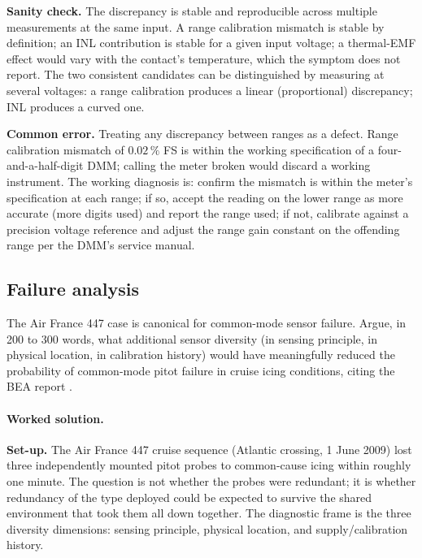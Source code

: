 \textbf{Sanity check.} The discrepancy is stable and reproducible
across multiple measurements at the same input. A range
calibration mismatch is stable by definition; an INL contribution
is stable for a given input voltage; a thermal-EMF effect would
vary with the contact's temperature, which the symptom does not
report. The two consistent candidates can be distinguished by
measuring at several voltages: a range calibration produces a
linear (proportional) discrepancy; INL produces a curved one.

\textbf{Common error.} Treating any discrepancy between ranges
as a defect. Range calibration mismatch of $0.02\,\%$ FS is
within the working specification of a four-and-a-half-digit DMM;
calling the meter broken would discard a working instrument. The
working diagnosis is: confirm the mismatch is within the meter's
specification at each range; if so, accept the reading on the
lower range as more accurate (more digits used) and report the
range used; if not, calibrate against a precision voltage
reference and adjust the range gain constant on the offending
range per the DMM's service manual.

\subsection*{Failure analysis}

\begin{exercise}
The Air France 447 case is canonical for common-mode sensor failure.
Argue, in 200 to 300 words, what additional sensor diversity (in
sensing principle, in physical location, in calibration history)
would have meaningfully reduced the probability of common-mode
pitot failure in cruise icing conditions, citing the BEA report
\cite{acc:bea-af447}.
\end{exercise}

\paragraph{Worked solution.}
\textbf{Set-up.} The Air France 447 cruise sequence (Atlantic
crossing, 1 June 2009) lost three independently mounted pitot
probes to common-cause icing within roughly one minute. The
question is not whether the probes were redundant; it is whether
redundancy of the type deployed could be expected to survive the
shared environment that took them all down together. The
diagnostic frame is the three diversity dimensions: sensing
principle, physical location, and supply/calibration history.

